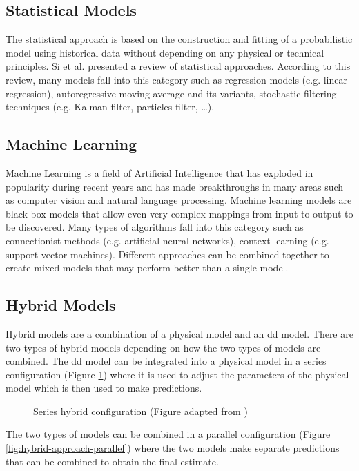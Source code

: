 \subsection{Statistical Models}
The statistical approach is based on the construction and fitting of a probabilistic model using historical data without depending on any physical or technical principles. 
Si et al. \cite{Si2011} presented a review of statistical approaches. According to this review, many models fall into this category such as regression models (e.g. linear regression), autoregressive moving average and its variants, stochastic filtering techniques (e.g. Kalman filter, particles filter, …).

\subsection{Machine Learning}
Machine Learning is a field of Artificial Intelligence that has exploded in popularity during recent years and has made breakthroughs in many areas such as computer vision and natural language processing. Machine learning models are black box models that allow even very complex mappings from input to output to be discovered. Many types of algorithms fall into this category such as connectionist methods (e.g. artificial neural networks), context learning (e.g. support-vector machines). Different approaches can be combined together to create mixed models that may perform better than a single model.

\subsection{Hybrid Models}
Hybrid models are a combination of a physical model and an \acrlong{dd} model. There are two types of hybrid models depending on how the two types of models are combined. The \acrlong{dd} model can be integrated into a physical model in a series configuration (Figure \ref{fig:hybrid-approach-series}) where it is used to adjust the parameters of the physical model which is then used to make predictions.

\begin{figure}[H]
    \centering
    
    \caption{Series hybrid configuration (Figure adapted from \cite{Mangili2013})}
    \label{fig:hybrid-approach-series}
\end{figure}

The two types of models can be combined in a parallel configuration (Figure \ref{fig:hybrid-approach-parallel}) where the two models make separate predictions that can be combined to obtain the final estimate.

